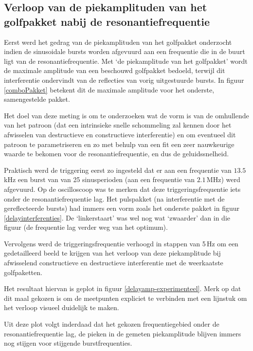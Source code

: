 \subsection{Verloop van de piekamplituden van het golfpakket nabij de 
resonantiefrequentie}
Eerst werd het gedrag van de piekamplituden van het golfpakket onderzocht 
indien de sinusoidale bursts worden afgevuurd aan een frequentie die in de 
buurt ligt van de resonantiefrequentie. Met `de piekamplitude van het 
golfpakket' wordt de maximale amplitude van een beschouwd golfpakket 
bedoeld, terwijl dit interferentie ondervindt van de reflecties van vorig 
uitgestuurde bursts. In figuur \ref{comboPakket} betekent dit de maximale 
amplitude voor het onderste, samengestelde pakket.

Het doel van deze meting is om te onderzoeken wat de vorm is van de 
omhullende van het patroon (dat een intrinsieke snelle schommeling zal 
kennen door het afwisselen van destructieve en constructieve interferentie) 
en om eventueel dit patroon te parametriseren en zo met behulp van een fit 
een zeer nauwkeurige waarde te bekomen voor de resonantiefrequentie, en dus 
de geluidssnelheid.

Praktisch werd de triggering eerst zo ingesteld dat er aan een frequentie 
van $13.5$\,kHz een burst van van 25 sinusperioden (aan een frequentie van 
$2.1$\,MHz) werd afgevuurd. Op de oscilloscoop was te merken dat deze 
triggeringsfrequentie iets onder de resonantiefrequentie lag. Het 
pulspakket (na interferentie met de gereflecteerde bursts) had immers een 
vorm zoals het onderste pakket in figuur \ref{delayinterferenties}. De 
`linkerstaart' was wel nog wat `zwaarder' dan in die figuur (de frequentie 
lag verder weg van het optimum).

Vervolgens werd de triggeringsfrequentie verhoogd in stappen van 5\,Hz om 
een gedetailleerd beeld te krijgen van het verloop van deze piekamplitude 
bij afwisselend constructieve en destructieve interferentie met de 
weerkaatste golfpaketten.

Het resultaat hiervan is geplot in figuur \ref{delayamp-experimenteel}.  
Merk op dat dit maal gekozen is om de meetpunten expliciet te verbinden met 
een lijnstuk om het verloop visueel duidelijk te maken.

Uit deze plot volgt inderdaad dat het gekozen frequentiegebied onder de 
resonantiefrequentie lag, de pieken in de gemeten piekamplitude blijven 
immers nog stijgen voor stijgende burstfrequenties.

